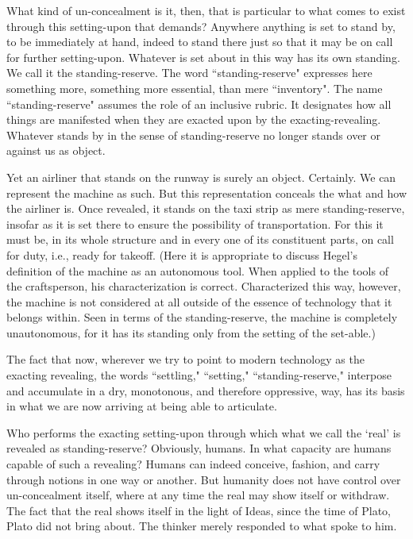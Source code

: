 \documentclass[paper=a4, fontsize=11pt,twoside]{scrartcl}
\begin{document}
What kind of un-concealment is it, then, that is particular to what comes to exist through this setting-upon that demands? Anywhere anything is set to stand by, to be immediately at hand, indeed to stand there just so that it may be on call for further setting-upon. Whatever is set about in this way has its own standing. We call it the standing-reserve. The word ``standing-reserve" expresses here something more, something more essential, than mere ``inventory". The name ``standing-reserve" assumes the role of an inclusive rubric. It designates how all things are manifested when they are exacted upon by the exacting-revealing. Whatever stands by in the sense of standing-reserve no longer stands over or against us as object.

Yet an airliner that stands on the runway is surely an object. Certainly. We can represent the machine as such. But this representation conceals the what and how the airliner is. Once revealed, it stands on the taxi strip as mere standing-reserve, insofar as it is set there to ensure the possibility of transportation. For this it must be, in its whole structure and in every one of its constituent parts, on call for duty, i.e., ready for takeoff. (Here it is appropriate to discuss Hegel's definition of the machine as an autonomous tool. When applied to the tools of the craftsperson, his characterization is correct. Characterized this way, however, the machine is not considered at all outside of the essence of technology that it belongs within. Seen in terms of the standing-reserve, the machine is completely unautonomous, for it has its standing only from the setting of the set-able.)

The fact that now, wherever we try to point to modern technology as the exacting revealing, the words ``settling," ``setting," ``standing-reserve," interpose and accumulate in a dry, monotonous, and therefore oppressive, way, has its basis in what we are now arriving at being able to articulate.

Who performs the exacting setting-upon through which what we call the `real' is revealed as standing-reserve? Obviously, humans. In what capacity are humans capable of such a revealing? Humans can indeed conceive, fashion, and carry through notions in one way or another. But humanity does not have control over un-concealment itself, where at any time the real may show itself or withdraw. The fact that the real shows itself in the light of Ideas, since the time of Plato, Plato did not bring about. The thinker merely responded to what spoke to him.
\end{document}
